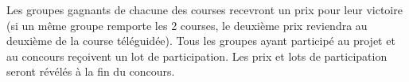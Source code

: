 Les groupes gagnants de chacune des courses recevront un prix pour leur victoire (si un même groupe remporte les 2 courses, le deuxième prix reviendra au deuxième de la course téléguidée). Tous les groupes ayant participé au projet et au concours reçoivent un lot de participation. Les prix et lots de participation seront révélés à la fin du concours.